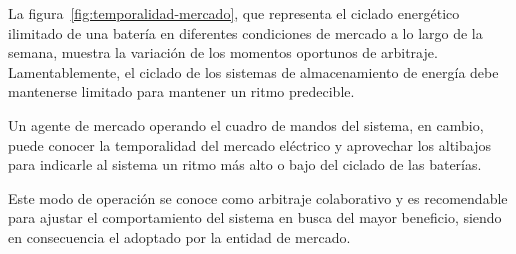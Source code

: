 La figura~\ref{fig:temporalidad-mercado}, que representa el ciclado energético ilimitado de una batería en diferentes condiciones de mercado a lo largo de la semana, muestra la variación de los momentos oportunos de arbitraje. Lamentablemente, el ciclado de los sistemas de almacenamiento de energía debe mantenerse limitado para mantener un ritmo predecible.

Un agente de mercado operando el cuadro de mandos del sistema, en cambio, puede conocer la temporalidad del mercado eléctrico y aprovechar los altibajos para indicarle al sistema un ritmo más alto o bajo del ciclado de las baterías.

Este modo de operación se conoce como arbitraje colaborativo y es recomendable para ajustar el comportamiento del sistema en busca del mayor beneficio, siendo en consecuencia el adoptado por la entidad de mercado.
